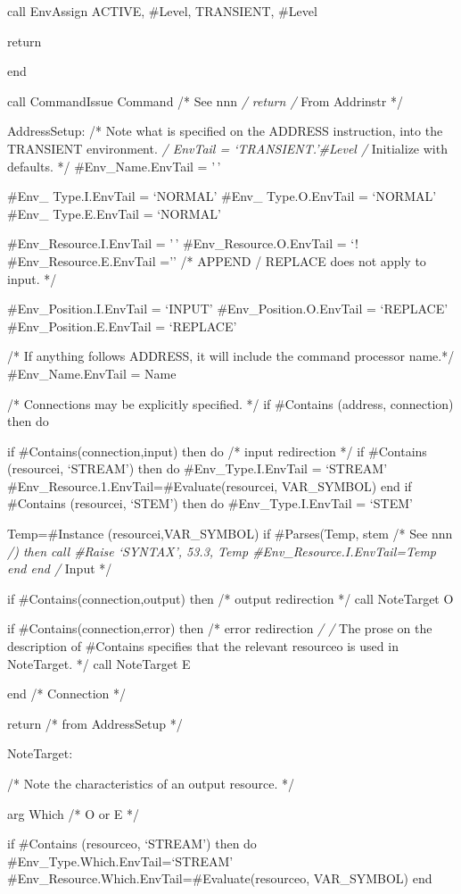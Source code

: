 call EnvAssign ACTIVE, \#Level, TRANSIENT, \#Level

return

end

call CommandIssue Command /* See nnn \emph{/ return /} From Addrinstr */

AddressSetup: /* Note what is specified on the ADDRESS instruction, into
the TRANSIENT environment. \emph{/ EnvTail = `TRANSIENT.'\#Level /}
Initialize with defaults. */ \#Env\_Name.EnvTail = '\,'

\#Env\_ Type.I.EnvTail = `NORMAL' \#Env\_ Type.O.EnvTail = `NORMAL'
\#Env\_ Type.E.EnvTail = `NORMAL'

\#Env\_Resource.I.EnvTail = '\,' \#Env\_Resource.O.EnvTail = `!
\#Env\_Resource.E.EnvTail ='' /* APPEND / REPLACE does not apply to
input. */

\#Env\_Position.I.EnvTail = `INPUT' \#Env\_Position.O.EnvTail =
`REPLACE' \#Env\_Position.E.EnvTail = `REPLACE'

/* If anything follows ADDRESS, it will include the command processor
name.*/ \#Env\_Name.EnvTail = Name

/* Connections may be explicitly specified. */ if \#Contains (address,
connection) then do

if \#Contains(connection,input) then do /* input redirection */ if
\#Contains (resourcei, `STREAM') then do \#Env\_Type.I.EnvTail =
`STREAM' \#Env\_Resource.1.EnvTail=\#Evaluate(resourcei, VAR\_SYMBOL)
end if \#Contains (resourcei, `STEM') then do \#Env\_Type.I.EnvTail =
`STEM'

Temp=\#Instance (resourcei,VAR\_SYMBOL) if \#Parses(Temp, stem /* See
nnn \emph{/) then call \#Raise `SYNTAX', 53.3, Temp
\#Env\_Resource.I.EnvTail=Temp end end /} Input */

if \#Contains(connection,output) then /* output redirection */ call
NoteTarget O

if \#Contains(connection,error) then /* error redirection \emph{/ /} The
prose on the description of \#Contains specifies that the relevant
resourceo is used in NoteTarget. */ call NoteTarget E

end /* Connection */

return /* from AddressSetup */

NoteTarget:

/* Note the characteristics of an output resource. */

arg Which /* O or E */

if \#Contains (resourceo, `STREAM') then do
\#Env\_Type.Which.EnvTail=`STREAM'
\#Env\_Resource.Which.EnvTail=\#Evaluate(resourceo, VAR\_SYMBOL) end

